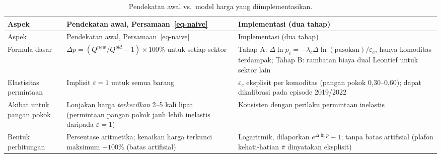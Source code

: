 \documentclass[
  manuscript=article,
  layout=publish,
  year=2026,
  volume=1,
]{den}
\begin{document}
\begin{longtable}[]{@{}
  >{\raggedright\arraybackslash}p{}
  >{\raggedright\arraybackslash}p{}
  >{\raggedright\arraybackslash}p{}@{}}
\caption{Pendekatan awal vs.~model harga yang
diimplementasikan.}\label{tbl-vsprice}\tabularnewline
\toprule\noalign{}
\begin{minipage}[b]{\linewidth}\raggedright
Aspek
\end{minipage} & \begin{minipage}[b]{\linewidth}\raggedright
Pendekatan awal, Persamaan~\ref{eq-naive}
\end{minipage} & \begin{minipage}[b]{\linewidth}\raggedright
Implementasi (dua tahap)
\end{minipage} \\
\midrule\noalign{}
\endfirsthead
\toprule\noalign{}
\begin{minipage}[b]{\linewidth}\raggedright
Aspek
\end{minipage} & \begin{minipage}[b]{\linewidth}\raggedright
Pendekatan awal, Persamaan~\ref{eq-naive}
\end{minipage} & \begin{minipage}[b]{\linewidth}\raggedright
Implementasi (dua tahap)
\end{minipage} \\
\midrule\noalign{}
\endhead
\bottomrule\noalign{}
\endlastfoot
Formula dasar & \(\Delta p = (Q^{new}/Q^{old} - 1) \times 100\%\) untuk
setiap sektor & Tahap A:
\(\Delta\ln p_c = -\lambda_c \Delta\ln(\text{pasokan})/\varepsilon_c\),
hanya komoditas terdampak; Tahap B: rambatan biaya dual Leontief untuk
sektor lain \\
Elastisitas permintaan & Implisit \(\varepsilon = 1\) untuk semua barang
& \(\varepsilon_c\) eksplisit per komoditas (pangan pokok 0,30--0,60);
dapat dikalibrasi pada episode 2019/2022 \\
Akibat untuk pangan pokok & Lonjakan harga \emph{terkecilkan} 2--5 kali
lipat (permintaan pangan pokok jauh lebih inelastis daripada
\(\varepsilon = 1\)) & Konsisten dengan perilaku permintaan inelastis \\
Bentuk perhitungan & Persentase aritmetika; kenaikan harga terkunci
maksimum \(+100\%\) (batas artifisial) & Logaritmik, dilaporkan
\(e^{\Delta\ln p} - 1\); tanpa batas artifisial (plafon kehati-hatian
\(\bar\pi\) dinyatakan eksplisit) \\

\end{longtable}
\end{document}
